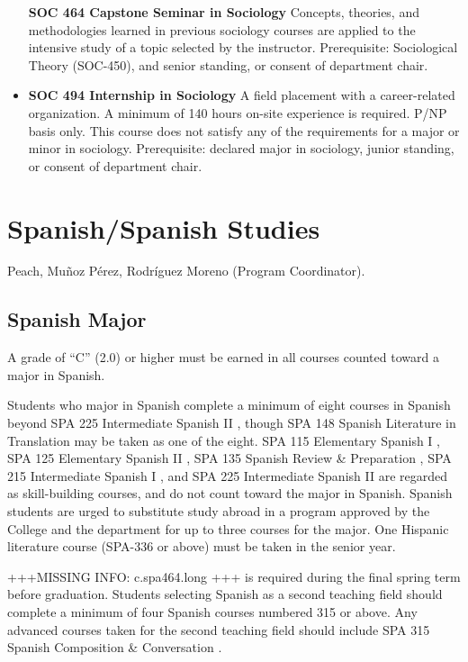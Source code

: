\documentclass[
  letterpaper,
]{scrbook}
\begin{document}
\begin{itemize}
  \textbf{SOC 464 Capstone Seminar in Sociology} Concepts, theories, and
  methodologies learned in previous sociology courses are applied to the
  intensive study of a topic selected by the instructor. Prerequisite:
  Sociological Theory (SOC-450), and senior standing, or consent of
  department chair.
\item
  \textbf{SOC 494 Internship in Sociology} A field placement with a
  career-related organization. A minimum of 140 hours on-site experience
  is required. P/NP basis only. This course does not satisfy any of the
  requirements for a major or minor in sociology. Prerequisite: declared
  major in sociology, junior standing, or consent of department chair.
\end{itemize}

\section{Spanish/Spanish Studies}\label{spanishspanish-studies}

Peach, Muñoz Pérez, Rodríguez Moreno (Program Coordinator).

\subsection{Spanish Major}\label{spanish-major}

A grade of ``C'' (2.0) or higher must be earned in all courses counted
toward a major in Spanish.

Students who major in Spanish complete a minimum of eight courses in
Spanish beyond SPA 225 Intermediate Spanish II , though SPA 148 Spanish
Literature in Translation may be taken as one of the eight. SPA 115
Elementary Spanish I , SPA 125 Elementary Spanish II , SPA 135 Spanish
Review \& Preparation , SPA 215 Intermediate Spanish I , and SPA 225
Intermediate Spanish II are regarded as skill-building courses, and do
not count toward the major in Spanish. Spanish students are urged to
substitute study abroad in a program approved by the College and the
department for up to three courses for the major. One Hispanic
literature course (SPA-336 or above) must be taken in the senior year.

+++MISSING INFO: c.spa464.long +++ is required during the final spring
term before graduation. Students selecting Spanish as a second teaching
field should complete a minimum of four Spanish courses numbered 315 or
above. Any advanced courses taken for the second teaching field should
include SPA 315 Spanish Composition \& Conversation .
\end{document}
